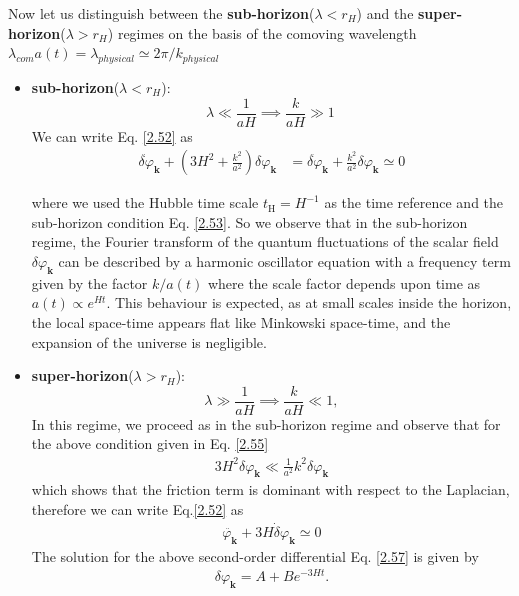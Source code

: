 Now let us distinguish between the \textbf{sub-horizon}($\lambda < r_H$) and the \textbf{super-horizon}($\lambda > r_H$) regimes on the basis of the comoving wavelength $\lambda_{com} a(t) = \lambda_{physical} \simeq 2\pi/k_{physical}$

\begin{itemize}
    \item  \textbf{sub-horizon}($\lambda < r_H$):\\
    \begin{equation}
        \lambda \ll \frac{1}{aH} \implies \frac{k}{aH} \gg 1\ \label{2.53}
    \end{equation}
    We can write Eq. \ref{2.52} as
    \begin{align}
        \ddot{ \delta \varphi} _{\mathbf{k}} + (3 H^2  + \frac{k^2}{a^2}) \delta \varphi _{\mathbf{k}} &=  \ddot{ \delta \varphi} _{\mathbf{k}} + \frac{k^2}{a^2} \delta \varphi _{\mathbf{k}} \simeq 0 \label{2.54}
    \end{align}  
    
    where we used the Hubble time scale \(t_{\mathrm{H}}=H^{-1}\) as the time reference and the sub-horizon condition Eq. \ref{2.53}. So we observe that in the sub-horizon regime, the Fourier transform of the quantum fluctuations of the scalar field $\delta \varphi_{\mathbf{k}}$ can be described by a harmonic oscillator equation with a  frequency term given by the factor $k / a(t)$ where the scale factor depends upon time as  \(a(t) \propto e^{Ht}\). This behaviour is expected, as at small scales inside the horizon, the local space-time appears flat like Minkowski space-time, and the expansion of the universe is negligible.
    
     \item  \textbf{super-horizon}($\lambda > r_H$):\\
    \begin{equation}
        \lambda \gg \frac{1}{aH} \implies \frac{k}{aH} \ll 1, \label{2.55}
    \end{equation}
    In this regime, we proceed as in the sub-horizon regime and observe that for the above condition given in Eq. \ref{2.55}
    \begin{align}
       3 H^{2} \delta \varphi_{\mathbf{k}} \ll \frac{1}{a^{2}} k^{2} \delta \varphi_{\mathbf{k}} \label{2.56}
    \end{align}
    which shows that the friction term is dominant with respect to the Laplacian, therefore we can write Eq.\ref{2.52} as
    \begin{align}
        \ddot{ \varphi_{\mathbf{k}}}+3 H \dot{\delta} \varphi_{\mathbf{k}} \simeq 0 \label{2.57}
    \end{align}    
    The solution for the above second-order differential Eq. \ref{2.57} is given by
   \begin{align}
        \delta \varphi_{\mathbf{k}}=A+B e^{-3 H t} .
    \end{align}
    

\end{itemize}
